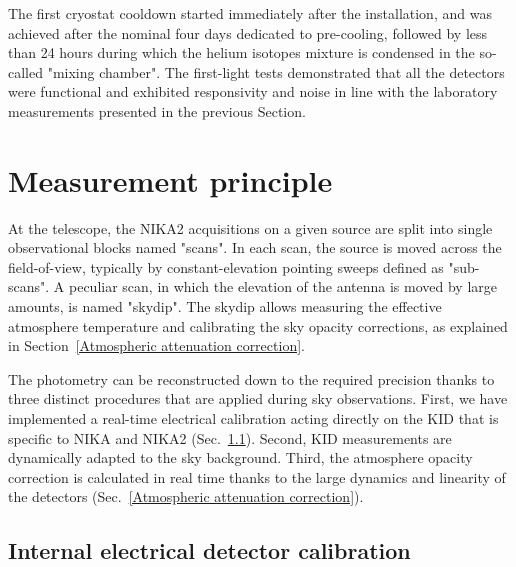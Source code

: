\documentclass[]{aa} %
\begin{document}
The first cryostat cooldown started immediately after the installation, and was achieved after the nominal four days dedicated to pre-cooling, followed by less than 24 hours during which the helium isotopes mixture is condensed in the so-called "mixing chamber". The first-light tests demonstrated that all the detectors were functional and exhibited responsivity and noise in line with the laboratory measurements presented in the previous Section. 


\section{Measurement principle}
\label{Measurement principle}

At the telescope, the NIKA2 acquisitions on a given source are split into single observational blocks named "scans". In each scan, the source is moved across the field-of-view, typically by constant-elevation pointing sweeps defined as "sub-scans". A peculiar scan, in which the elevation of the antenna is moved by large amounts, is named "skydip". The skydip allows measuring the effective atmosphere temperature and calibrating the sky opacity corrections, as explained in Section~\ref{Atmospheric attenuation correction}.

The photometry can be reconstructed down to the required precision thanks to three distinct procedures that are applied during sky observations. First, we have implemented a real-time electrical calibration acting directly on the KID that is specific to NIKA and NIKA2 (Sec.~\ref{Internal detectors calibration}). Second, KID measurements are dynamically adapted to the sky background. Third, the atmosphere opacity correction is calculated in real time thanks to the large dynamics and linearity of the detectors (Sec.~\ref{Atmospheric attenuation correction}).



\subsection{Internal electrical detector calibration}
\label{Internal detectors calibration}
\end{document}
